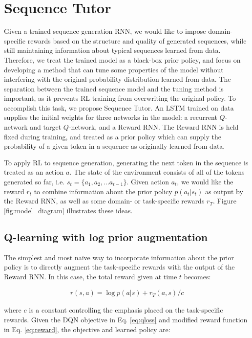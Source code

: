 \section{Sequence Tutor}

\label{sec:rltutor}
Given a trained sequence generation RNN, we would like to impose domain-specific rewards based on the structure and quality of generated sequences, while still maintaining information about typical sequences learned from data. Therefore, we treat the trained model as a black-box prior policy, and focus on developing a method that can tune some properties of the model without interfering with the original probability distribution learned from data. The separation between the trained sequence model and the tuning method is important, as it prevents RL training from overwriting the original policy. To accomplish this task, we propose Sequence Tutor. An LSTM trained on data supplies the initial weights for three networks in the model: a recurrent $Q$-network and target $Q$-network, and a Reward RNN. The Reward RNN is held fixed during training, and treated as a prior policy which can supply the probability of a given token in a sequence as originally learned from data. 

To apply RL to sequence generation, generating the next token in the sequence is treated as an action $a$. The state of the environment consists of all of the tokens generated so far, i.e. $s_t = \{a_1, a_2, ... a_{t-1}\}$. Given action $a_t$, we would like the reward $r_t$ to combine information about the prior policy $p(a_t|s_t)$ as output by the Reward RNN, as well as some domain- or task-specific rewards $r_T$. Figure \ref{fig:model_diagram} illustrates these ideas.

\subsection{Q-learning with log prior augmentation} The simplest and most na\"{i}ve way to incorporate information about the prior policy is to directly augment the task-specific rewards with the output of the Reward RNN. In this case, the total reward given at time $t$ becomes:

\begin{align} 
\label{eq:reward}
r(s,a) = \log p(a|s) + r_{T}(a,s)/c
\end{align}

where $c$ is a constant controlling the emphasis placed on the task-specific rewards. Given the DQN objective in Eq. \ref{eq:qloss} and modified reward function in Eq. \ref{eq:reward}, the objective and learned policy are:

